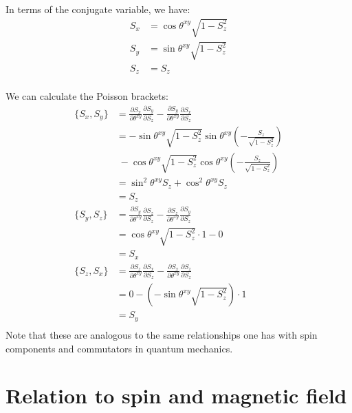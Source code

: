 \documentclass[aps,pra,10pt,floatfix,nofootinbib]{revtex4-1}
\theoremstyle{definition}
\begin{document}
In terms of the conjugate variable, we have:
\begin{equation}
\begin{aligned}
S_x &= \cos \theta^{xy} \sqrt{1-S_z^2} \\
S_y &= \sin \theta^{xy} \sqrt{1-S_z^2} \\
S_z &= S_z\\
\end{aligned}
\label{SpinComponents}
\end{equation}

We can calculate the Poisson brackets:
\begin{equation}
\begin{aligned}
\{S_x, S_y\} &= \frac{\partial S_x}{\partial \theta^{xy}}\frac{\partial S_y}{\partial S_z} - \frac{\partial S_y}{\partial \theta^{xy}}\frac{\partial S_x}{\partial S_z} \\
&= -\sin \theta^{xy} \sqrt{1-S_z^2} \sin \theta^{xy} (- \frac{S_z}{\sqrt{1-S_z^2}})  \\ 
&\; - \cos \theta^{xy} \sqrt{1-S_z^2} \cos \theta^{xy} (- \frac{S_z}{\sqrt{1-S_z^2}}) \\
&= \sin^2 \theta^{xy} S_z +\cos^2 \theta^{xy} S_z \\
&= S_z \\
\{S_y, S_z\} &= \frac{\partial S_y}{\partial \theta^{xy}}\frac{\partial S_z}{\partial S_z} - \frac{\partial S_z}{\partial \theta^{xy}}\frac{\partial S_y}{\partial S_z} \\
&= \cos \theta^{xy} \sqrt{1-S_z^2} \cdot 1 - 0 \\
&= S_x \\
\{S_z, S_x\} &= \frac{\partial S_z}{\partial \theta^{xy}}\frac{\partial S_x}{\partial S_z} - \frac{\partial S_x}{\partial \theta^{xy}}\frac{\partial S_z}{\partial S_z} \\
&= 0 - (-\sin \theta^{xy} \sqrt{1-S_z^2}) \cdot 1 \\
&= S_y \\
\end{aligned}
\label{SpinBrackets}
\end{equation}
Note that these are analogous to the same relationships one has with spin components and commutators in quantum mechanics.

\section{Relation to spin and magnetic field}
\end{document}
